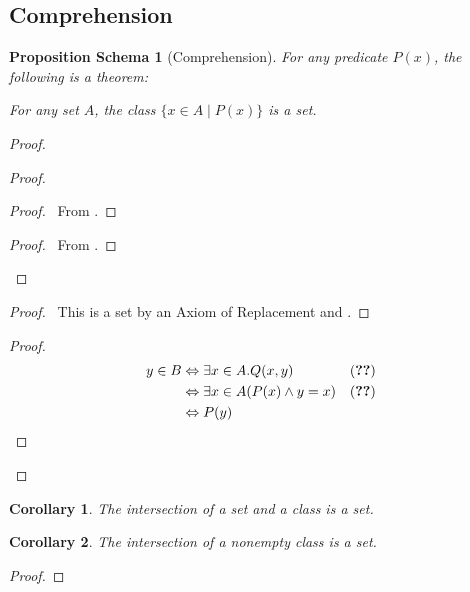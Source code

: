 \documentclass{book}
\let\qed\relax
\newtheorem{props}[ax]{Proposition Schema}
\newtheorem{cor}{Corollary}[ax]
\theoremstyle{definition}
\begin{document}
\subsection{Comprehension}

\begin{props}[Comprehension]
For any predicate $P(x)$, the following is a theorem:

For any set $A$, the class $\{x \in A \mid P(x)\}$ is a set.
\end{props}

\begin{proof}
\pf
{}
\begin{proof}
	\begin{proof}
		\pf\ From .
	\end{proof}
	\begin{proof}
		\pf\ From .
	\end{proof}
\end{proof}
\begin{proof}
	\pf\ This is a set by an Axiom of Replacement and .
\end{proof}
\begin{proof}
	\pf
	\begin{align*}
		y \in B & \Leftrightarrow \exists x \in A. Q(x,y) & (\text{\stepref{4}}) \\
		& \Leftrightarrow \exists x \in A (P(x) \wedge y = x) & (\text{\stepref{2}}) \\
		& \Leftrightarrow P(y)
	\end{align*}
\end{proof}
\qed
\end{proof}

\begin{cor}
The intersection of a set and a class is a set.
\end{cor}

\begin{cor}
The intersection of a nonempty class is a set.
\end{cor}

\begin{proof}
\pf
{}
\qed
\end{proof}
\end{document}
